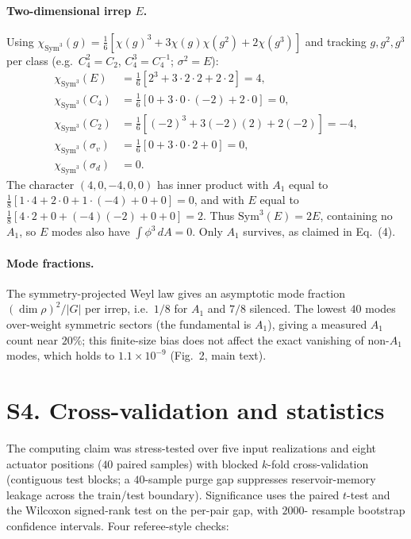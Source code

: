 \documentclass[aps,prapplied,reprint,amsmath,amssymb,floatfix]{revtex4-2}
\begin{document}
\paragraph{Two-dimensional irrep $E$.} Using
$\chi_{\mathrm{Sym}^3}(g)=\tfrac16[\chi(g)^3+3\chi(g)\chi(g^2)+2\chi(g^3)]$ and
tracking $g,g^2,g^3$ per class (e.g.\ $C_4^2=C_2$, $C_4^3=C_4^{-1}$;
$\sigma^2=E$):
\begin{align*}
\chi_{\mathrm{Sym}^3}(E) &=\tfrac16[2^3+3\!\cdot\!2\!\cdot\!2+2\!\cdot\!2]=4,\\
\chi_{\mathrm{Sym}^3}(C_4)&=\tfrac16[0+3\!\cdot\!0\!\cdot\!(-2)+2\!\cdot\!0]=0,\\
\chi_{\mathrm{Sym}^3}(C_2)&=\tfrac16[(-2)^3+3(-2)(2)+2(-2)]=-4,\\
\chi_{\mathrm{Sym}^3}(\sigma_v)&=\tfrac16[0+3\!\cdot\!0\!\cdot\!2+0]=0,\\
\chi_{\mathrm{Sym}^3}(\sigma_d)&=0 .
\end{align*}
The character $(4,0,-4,0,0)$ has inner product with $A_1$ equal to
$\tfrac18[1\!\cdot\!4+2\!\cdot\!0+1\!\cdot\!(-4)+0+0]=0$, and with $E$ equal to
$\tfrac18[4\!\cdot\!2+0+(-4)(-2)+0+0]=2$. Thus $\mathrm{Sym}^3(E)=2E$,
containing no $A_1$, so $E$ modes also have $\int\phi^3\,dA=0$. Only $A_1$
survives, as claimed in Eq.~(4).

\paragraph{Mode fractions.} The symmetry-projected Weyl law gives an
asymptotic mode fraction $(\dim\rho)^2/|G|$ per irrep, i.e.\ $1/8$ for $A_1$ and
$7/8$ silenced. The lowest $40$ modes over-weight symmetric sectors (the
fundamental is $A_1$), giving a measured $A_1$ count near $20\%$; this
finite-size bias does not affect the exact vanishing of non-$A_1$ modes, which
holds to $1.1\times10^{-9}$ (Fig.~2, main text).

\section{S4. Cross-validation and statistics}

The computing claim was stress-tested over five input realizations and eight
actuator positions ($40$ paired samples) with blocked $k$-fold cross-validation
(contiguous test blocks; a $40$-sample purge gap suppresses reservoir-memory
leakage across the train/test boundary). Significance uses the paired
$t$-test and the Wilcoxon signed-rank test on the per-pair gap, with $2000$-
resample bootstrap confidence intervals. Four referee-style checks:
\end{document}
